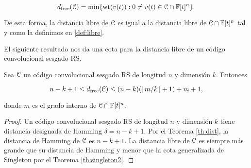 $$d_{\text{free}}(\mathcal C) = \min\{\text{wt}(v(t)) : 0 \neq v(t) \in \mathcal C \cap \mathbb{F}[t]^n\}.$$ 

De esta forma, la distancia libre de $\mathcal C$ es igual a la distancia libre de $\mathcal C \cap \mathbb{F}[t]^n$ tal y como la definimos en \ref{def:libre}.

El siguiente resultado nos da una cota para la distancia libre de un código convolucional sesgado RS.

\begin{corolario}
Sea $\mathcal C$ un código convolucional sesgado RS de longitud $n$ y dimensión $k$. Entonces

\begin{equation}
n - k + 1 \leq d_{\text{free}}(\mathcal C) \leq (n-k)(\lfloor m/k \rfloor + 1) + m + 1,
\end{equation}

donde $m$ es el grado interno de $\mathcal C \cap \mathbb{F}[t]^n$.

\end{corolario}

\begin{proof}
Un código convolucional sesgado RS de longitud $n$ y dimensión $k$ tiene distancia designada de Hamming $\delta = n - k + 1$. Por el Teorema \ref{th:dist}, la distancia de Hamming de $\mathcal C$ es $n - k +1$. La distancia libre de $\mathcal C$ es siempre más grande que su distancia de Hamming y menor que la cota generalizada de Singleton por el Teorema \ref{th:singleton2}. 
    
\end{proof}






\endinput